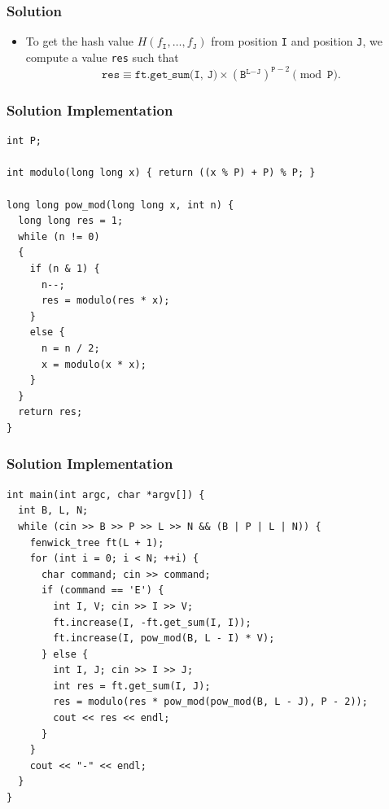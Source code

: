 \documentclass{beamer}
\begin{document}
\begin{frame}%
\frametitle{Solution}

\footnotesize

\begin{itemize}

\item To get the hash value $H(f_{\texttt{I}}, \ldots, f_{\texttt{J}})$ from position \texttt{I} and position \texttt{J}, we compute a value \texttt{res}
such that
$$
\texttt{res} \equiv \texttt{ft.get\_sum(I, J)} \times (\texttt{B}^{\texttt{L} - \texttt{J}})^{\texttt{P} - 2} \pmod{\texttt{P}}.
$$


\end{itemize}

\end{frame}

\begin{frame}[containsverbatim]
\frametitle{Solution Implementation}

\scriptsize

\begin{lstlisting}[mathescape]
int P;

int modulo(long long x) { return ((x % P) + P) % P; }

long long pow_mod(long long x, int n) {
  long long res = 1;
  while (n != 0)
  {
    if (n & 1) {
      n--;
      res = modulo(res * x);
    }
    else {
      n = n / 2;
      x = modulo(x * x);
    }
  }
  return res;
}
\end{lstlisting}

\end{frame}

\begin{frame}[containsverbatim]
\frametitle{Solution Implementation}

\scriptsize

\begin{lstlisting}[mathescape]
int main(int argc, char *argv[]) {
  int B, L, N;
  while (cin >> B >> P >> L >> N && (B | P | L | N)) {
    fenwick_tree ft(L + 1);
    for (int i = 0; i < N; ++i) {
      char command; cin >> command;
      if (command == 'E') {
        int I, V; cin >> I >> V;
        ft.increase(I, -ft.get_sum(I, I));
        ft.increase(I, pow_mod(B, L - I) * V);
      } else {
        int I, J; cin >> I >> J;
        int res = ft.get_sum(I, J);
        res = modulo(res * pow_mod(pow_mod(B, L - J), P - 2));
        cout << res << endl;
      }
    }
    cout << "-" << endl;
  }
}
\end{lstlisting}

\end{frame}
\end{document}
